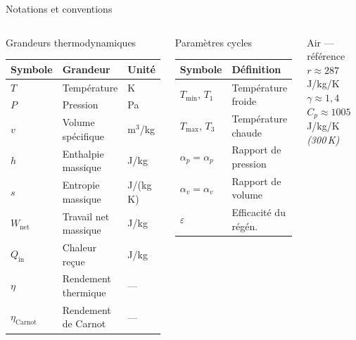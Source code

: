 \documentclass[aspectratio=43, 10pt]{beamer}
\newcommand{\Tmin}{T_{\min}}
\newcommand{\Tmax}{T_{\max}}
\newcommand{\rp}{\alpha_p}
\newcommand{\rv}{\alpha_v}
\newcommand{\etaC}{\eta_{\text{Carnot}}}
\newcommand{\Wnet}{W_{\text{net}}}
\newcommand{\Qin}{Q_{\text{in}}}
\begin{document}
\begin{frame}{Notations et conventions}

  \begin{columns}[T,onlytextwidth]
      \begin{block}{Grandeurs thermodynamiques}
        \scriptsize
        \renewcommand{\arraystretch}{1.1}
        \begin{tabular}{@{}lll@{}}
          \toprule
          Symbole & Grandeur & Unit\'e \\
          \midrule
          $T$       & Temp\'erature           & K \\
          $P$       & Pression                & Pa\\
          $v$       & Volume sp\'ecifique     & m$^3$/kg \\
          $h$       & Enthalpie massique      & J/kg \\
          $s$       & Entropie massique       & J/(kg\,K) \\
          $\Wnet$   & Travail net massique    & J/kg \\
          $\Qin$    & Chaleur re\c{c}ue       & J/kg \\
          $\eta$    & Rendement thermique     & --- \\
          $\etaC$   & Rendement de Carnot     & --- \\
          \bottomrule
        \end{tabular}
      \end{block}

      \begin{block}{Param\`etres cycles}
        \scriptsize
        \renewcommand{\arraystretch}{1.1}
        \begin{tabular}{ll}
          \toprule
          Symbole & D\'efinition \\
          \midrule
          $\Tmin$, $T_1$           & Temp\'erature froide \\
          $\Tmax$, $T_3$           & Temp\'erature chaude \\
          $\rp = \alpha_p$      & Rapport de pression \\
          $\rv = \alpha_v$& Rapport de volume \\
          $\varepsilon$            & Efficacit\'e du r\'eg\'en. \\
          \bottomrule
        \end{tabular}
      \end{block}

      \vspace{0.3em}
      \begin{exampleblock}{\footnotesize Air --- r\'ef\'erence}
        \footnotesize
        $r \approx 287$\,J/kg/K\\
        $\gamma \approx 1{,}4$\\
        $C_p \approx 1005$\,J/kg/K \textit{(300\,K)}
      \end{exampleblock}
  \end{columns}

\end{frame}
\end{document}
